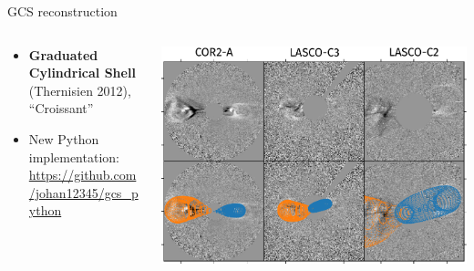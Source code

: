 \documentclass[10pt,aspectratio=169,usenames,dvipsnames]{beamer}
\begin{document}
\begin{frame}{GCS reconstruction}
    \begin{columns}
        \begin{column}{0.4\textwidth}
            \begin{itemize}
                \item \textbf{Graduated Cylindrical Shell} (Thernisien 2012), ``Croissant''
                \item New Python implementation:\\ {\scriptsize\url{https://github.com/johan12345/gcs_python}}
            \end{itemize}
            \centering
            
        \end{column}
        \begin{column}{0.5\textwidth}
            \centering
            \includegraphics[width=\textwidth]{plots/gcs_reconstruction.pdf}
        \end{column}
    \end{columns}
\end{frame}
\end{document}
